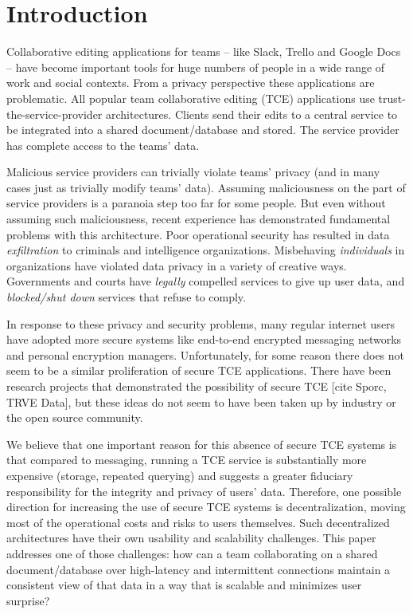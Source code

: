 \documentclass[runningheads]{llncs}
\begin{document}
\section{Introduction}

Collaborative editing applications for teams -- like Slack, Trello and Google Docs -- have become important tools for huge numbers of people in a wide range of work and social contexts.
From a privacy perspective these applications are problematic.
All popular team collaborative editing (TCE) applications use trust-the-service-provider architectures.
Clients send their edits to a central service to be integrated into a shared document{\slash}database and stored.
The service provider has complete access to the teams' data.

Malicious service providers can trivially violate teams' privacy (and in many cases just as trivially modify teams' data).
Assuming maliciousness on the part of service providers is a paranoia step too far for some people.
But even without assuming such maliciousness, recent experience has demonstrated fundamental problems with this architecture.
Poor operational security has resulted in data \emph{exfiltration} to criminals and intelligence organizations.
Misbehaving \emph{individuals} in organizations have violated data privacy in a variety of creative ways.
Governments and courts have \emph{legally} compelled services to give up user data, and \emph{blocked{\slash}shut down} services that refuse to comply.

In response to these privacy and security problems, many regular internet users have adopted more secure systems like end-to-end encrypted messaging networks and personal encryption managers.
Unfortunately, for some reason there does not seem to be a similar proliferation of secure TCE applications.
There have been research projects that demonstrated the possibility of secure TCE [cite Sporc, TRVE Data], but these ideas do not seem to have been taken up by industry or the open source community.

We believe that one important reason for this absence of secure TCE systems is that compared to messaging, running a TCE service is substantially more expensive (storage, repeated querying) and suggests a greater fiduciary responsibility for the integrity and privacy of users' data.
Therefore, one possible direction for increasing the use of secure TCE systems is decentralization, moving most of the operational costs and risks to users themselves.
Such decentralized architectures have their own usability and scalability challenges.
This paper addresses one of those challenges: how can a team collaborating on a shared document{\slash}database over high-latency and intermittent connections maintain a consistent view of that data in a way that is scalable and minimizes user surprise?
\end{document}
